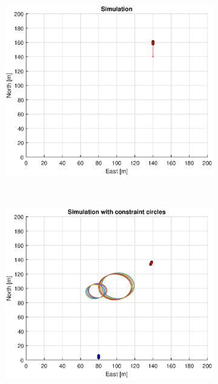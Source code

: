 \begin{figure}[!b]
\begin{subfigure}[b]{0.499\textwidth}
        \includegraphics[width=\textwidth]{Images/Figures/sving_GW/Simple0_f600_Frame1}
    \end{subfigure}
    \hfill
    \\
    \begin{subfigure}[b]{0.49\textwidth}
        \centering
        \includegraphics[width=\textwidth]{Images/Figures/sving_GW/Simple0_f1_Frame2}
    \end{subfigure}
    \hfill
    \begin{subfigure}[b]{0.499\textwidth}

\end{subfigure}
\end{figure}
